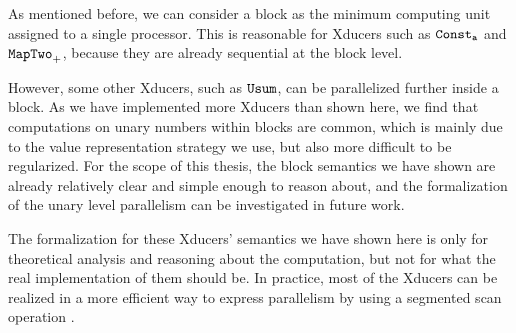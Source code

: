 As mentioned before, we can consider a block  as the minimum computing unit assigned to a single processor. This is reasonable for
Xducers such as $\mathtt{Const_{a}}$ and $\mathtt{MapTwo}_{+}$, because
they are already sequential at the block level. 

However, some other Xducers, such as $\mathtt{Usum}$, can be parallelized further inside a block.
As we have implemented more Xducers than shown here, we find that computations on unary numbers within blocks are common, which is mainly due to the value representation strategy we use, but also more difficult to be regularized.
For the scope of this thesis, the block semantics we have shown are already relatively clear and simple enough to reason about, and the formalization of the unary level parallelism can be investigated in future work. 


The formalization for these Xducers' semantics we have shown here is only for theoretical analysis and reasoning about the computation, but not for what the real implementation of them should be. 
In practice, most of the Xducers can be realized in a more efficient way to express parallelism by using a segmented scan operation \cite{blel89scan}. 

%
%
%
%
%
%
%
%
%
%
%
%
%

